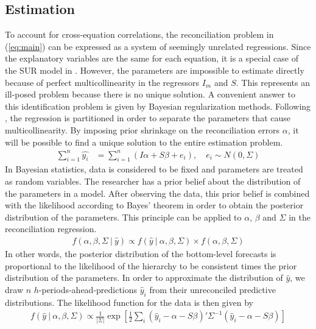 \documentclass[a4paper,fleqn,11pt]{article}
\begin{document}
\subsection{Estimation}
To account for cross-equation correlations, the reconciliation problem in (\ref{eq:main}) can be expressed as a system of seemingly unrelated regressions. Since the explanatory variables are the same for each equation, it is a special case of the SUR model in \cite{Zellner1962}. However, the parameters are impossible to estimate directly because of perfect multicollinearity in the regressors $I_m$ and $S$. This represents an ill-posed problem because there is no unique solution. A convenient answer to this identification problem is given by Bayesian regularization methods. Following \cite{Farebrother1978}, the regression is partitioned in order to separate the parameters that cause multicollinearity. By imposing prior shrinkage on the reconciliation errors $\alpha$, it will be possible to find a unique solution to the entire estimation problem.
\begin{align}
	\sum_{i=1}^n \hat{y_i} &= \sum_{i=1}^n \left(I\alpha + S\beta + e_i\right),\quad e_i \sim N(0,\Sigma)
\end{align}
In Bayesian statistics, data is considered to be fixed and parameters are treated as random variables. The researcher has a prior belief about the distribution of the parameters in a model. After observing the data, this prior belief is combined with the likelihood according to Bayes' theorem in order to obtain the posterior distribution of the parameters. This principle can be applied to $\alpha$, $\beta$ and $\Sigma$ in the reconciliation regression.
\begin{align}
	f(\alpha, \beta, \Sigma\ |\ \hat{y}) \propto f(\hat{y}\ |\ \alpha, \beta, \Sigma) \times f(\alpha, \beta, \Sigma)
\end{align}
In other words, the posterior distribution of the bottom-level forecasts is proportional to the likelihood of the hierarchy to be consistent times the prior distribution of the parameters. In order to approximate the distribution of $\hat{y}$, we draw $n$ $h$-periods-ahead-predictions $\hat{y}_i$ from their unreconciled predictive distributions. The likelihood function for the data is then given by 
\begin{align*}
f(\hat{y}\ |\ \alpha,\beta,\Sigma) \propto \frac{1}{|\Sigma|}\exp\left[\frac{1}{2} \sum_i (\hat{y}_i - \alpha - S\beta)'\Sigma^{-1}(\hat{y}_i - \alpha - S\beta)\right]
\end{align*}
\end{document}
